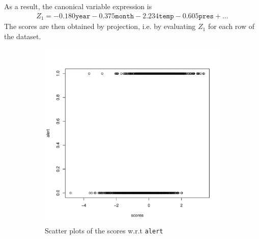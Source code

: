 \documentclass[a4paper, 12pt]{article}
\begin{document}
	As a result, the canonical variable expression is 
	\begin{align*}
	    Z_1 = -\num{0.180} \texttt{year} - \num{0.375} \texttt{month} - \num{2.234} \texttt{temp} - \num{0.605} \texttt{pres} + \ldots
	\end{align*}
	The scores are then obtained by projection, i.e. by evaluating $Z_1$ for each row of the dataset.
	
	\begin{figure}[h]
        \centering
        \begin{subfigure}{0.48\textwidth}
            \includegraphics[width = \textwidth]{resources/pdf/lda_full_scatter.pdf}
            \caption{Scatter plots of the scores w.r.t \texttt{alert}}
        \end{subfigure}
        \hspace{0.5em}
        \begin{subfigure}{0.48\textwidth}

\end{subfigure}
\end{figure}
\end{document}
